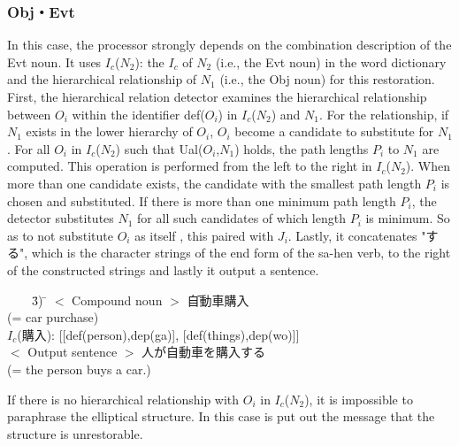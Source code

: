 \subsubsection{Obj・Evt}
 In this case, the processor strongly depends on the combination
description of the Evt noun. It uses $I_c$($N_2$): the $I_c$ of $N_2$
(i.e., the Evt noun) in the word dictionary and the hierarchical
relationship of $N_1$ (i.e., the Obj noun) for this restoration.
First, the hierarchical relation detector examines the hierarchical
relationship between $O_i$ within the identifier def($O_i$) in
$I_c$($N_2$) and $N_1$. For the relationship, if $N_1$ exists in the
lower hierarchy of $O_i$, $O_i$ become a candidate to substitute
for $N_1$. For all $O_i$ in $I_c$($N_2$) such that Ual($O_i$,$N_1$)
holds, the path lengths $P_i$ to $N_1$ are computed. This operation is
performed from the left to the right in $I_c$($N_2$). When more than
one candidate exists, the candidate with the smallest path length $P_i$
is chosen and substituted. If there is more than one minimum path
length $P_i$, the detector substitutes $N_1$ for all such candidates
of which length $P_i$ is minimum. So as to not substitute $O_i$ as
itself , this paired with $J_i$. Lastly, it concatenates "する", which
is the character strings of the end form of the sa-hen verb, to the
right of the constructed strings and lastly it output a sentence.
\begin{tabbing}
\ \ \ \ \= 3) \= $<$ Compound noun $>$ \=  自動車購入\\
	\>    \>                      \>(= car purchase)\\
	\>    \> $I_c$(購入): [[def(person),dep(ga)], [def(things),dep(wo)]]\\
	\>    \> $<$ Output sentence $>$ \>  人が自動車を購入する \\
	\>    \>                    \> (= the person buys a car.)
\end{tabbing}
 
If there is no hierarchical relationship with $O_i$ in $I_c$($N_2$),
it is impossible to paraphrase the elliptical structure. In this case is
put out the message that the structure is unrestorable.

